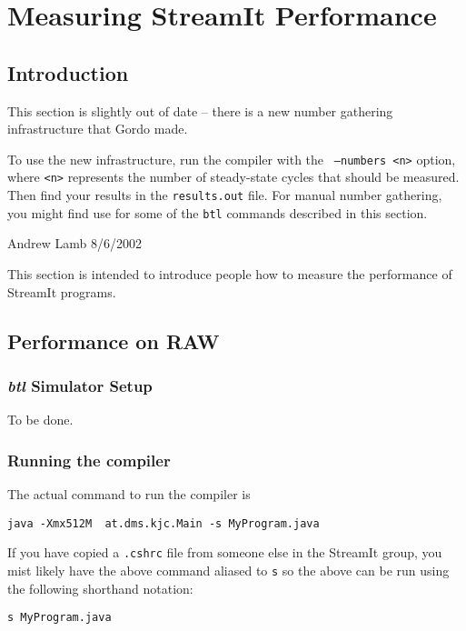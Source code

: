 \section{Measuring StreamIt Performance}
\subsection{Introduction}
{\huge This section is slightly out of date -- there is a new number
gathering infrastructure that Gordo made.} 

To use the new infrastructure, run the compiler with the {\tt
--numbers <n>} option, where {\tt <n>} represents the number of
steady-state cycles that should be measured.  Then find your results
in the {\tt results.out} file.  For manual number gathering, you might find
use for some of the {\tt btl} commands described in this section.

\vspace{12pt}

\noindent Andrew Lamb 8/6/2002

This section is intended to introduce people how to measure the performance
of StreamIt programs.


\subsection{Performance on RAW}
\subsubsection{\textit{btl} Simulator Setup}
To be done.

\subsubsection{Running the compiler}
The actual command to run the compiler is 
\begin{verbatim}java -Xmx512M  at.dms.kjc.Main -s MyProgram.java\end{verbatim}

If you have copied a \texttt{.cshrc} file from someone else in the
StreamIt group, you mist likely have the above command aliased to \texttt{s}
so the above can be run using the following shorthand notation:
\begin{verbatim}s MyProgram.java\end{verbatim}

